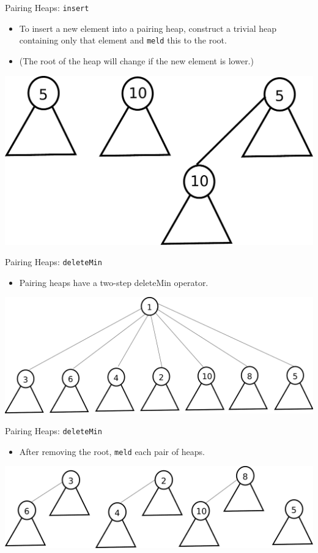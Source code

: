 \documentclass{beamer}
\begin{document}
\begin{frame}{Pairing Heaps: \texttt{insert}}
  \begin{itemize}
    \item To insert a new element into a pairing heap, construct a
      trivial heap containing only that element and \texttt{meld}
      this to the root.
    \item (The root of the heap will change if the new element is lower.)
  \end{itemize}
  \includegraphics[scale=0.30]{img/simpleMeld2.pdf}
\end{frame}

\begin{frame}{Pairing Heaps: \texttt{deleteMin}}
  \begin{itemize}
    \item Pairing heaps have a two-step deleteMin operator.
  \end{itemize}
  \includegraphics[scale=0.25]{img/deleteMin1.pdf}
\end{frame}

\begin{frame}{Pairing Heaps: \texttt{deleteMin}}
  \begin{itemize}
    \item After removing the root, \texttt{meld} each pair of heaps.
  \end{itemize}
  \includegraphics[scale=0.25]{img/deleteMin2.pdf}
\end{frame}
\end{document}
